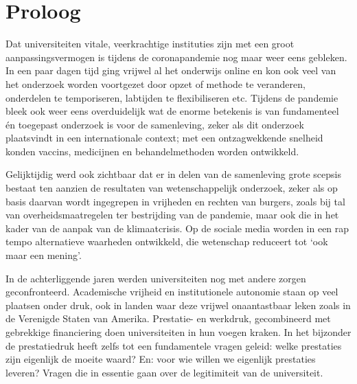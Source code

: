 \documentclass[empirical, authordate, ]{new-jote-article}
\begin{document}
	\chapter{Proloog}































	Dat universiteiten vitale, veerkrachtige instituties zijn met een groot aanpassingsvermogen is tijdens de coronapandemie nog maar weer eens gebleken. In een paar dagen tijd ging vrijwel al het onderwijs online en kon ook veel van het onderzoek worden voortgezet door opzet of methode te veranderen, onderdelen te temporiseren, labtijden te flexibiliseren etc. Tijdens de pandemie bleek ook weer eens overduidelijk wat de enorme betekenis is van fundamenteel én toegepast onderzoek is voor de samenleving, zeker als dit onderzoek plaatsvindt in een internationale context; met een ontzagwekkende snelheid konden vaccins, medicijnen en behandelmethoden worden ontwikkeld.



	Gelijktijdig werd ook zichtbaar dat er in delen van de samenleving grote scepsis bestaat ten aanzien de resultaten van wetenschappelijk onderzoek, zeker als op basis daarvan wordt ingegrepen in vrijheden en rechten van burgers, zoals bij tal van overheidsmaatregelen ter bestrijding van de pandemie, maar ook die in het kader van de aanpak van de klimaatcrisis. Op de sociale media worden in een rap tempo alternatieve waarheden ontwikkeld, die wetenschap reduceert tot ‘ook maar een mening'.



	In de achterliggende jaren werden universiteiten nog met andere zorgen geconfronteerd. Academische vrijheid en institutionele autonomie staan op veel plaatsen onder druk, ook in landen waar deze vrijwel onaantastbaar leken zoals in de Verenigde Staten van Amerika. Prestatie- en werkdruk, gecombineerd met gebrekkige financiering doen universiteiten in hun voegen kraken. In het bijzonder de prestatiedruk heeft zelfs tot een fundamentele vragen geleid: welke prestaties zijn eigenlijk de moeite waard? En: voor wie willen we eigenlijk prestaties leveren? Vragen die in essentie gaan over de legitimiteit van de universiteit.
\end{document}
